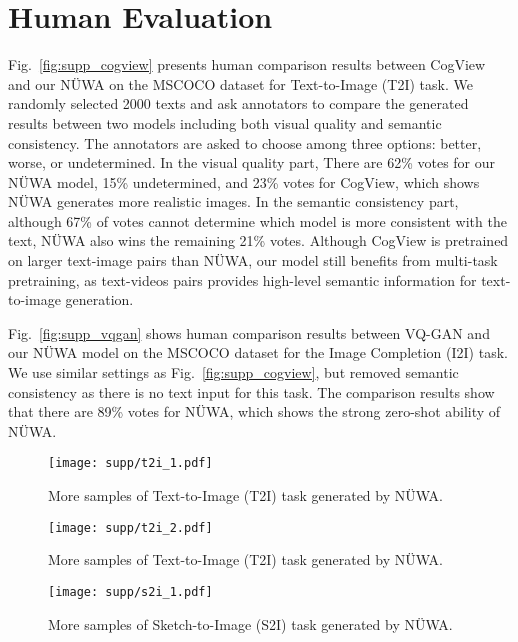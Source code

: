 \documentclass[10pt,twocolumn,letterpaper]{article}
\begin{document}
\section{Human Evaluation}
Fig.~\ref{fig:supp_cogview} presents human comparison results between CogView\cite{dingCogViewMasteringTexttoImage2021} and our NÜWA on the MSCOCO dataset for Text-to-Image (T2I) task. We randomly selected 2000 texts and ask annotators to compare the generated results between two models including both visual quality and semantic consistency. The annotators are asked to choose among three options: better, worse, or undetermined. In the visual quality part, There are 62\% votes for our NÜWA model, 15\% undetermined, and 23\% votes for CogView, which shows NÜWA generates more realistic images. In the semantic consistency part, although 67\% of votes cannot determine which model is more consistent with the text, NÜWA also wins the remaining 21\% votes. Although CogView is pretrained on larger text-image pairs than NÜWA, our model still benefits from multi-task pretraining, as text-videos pairs provides high-level semantic information for text-to-image generation.

Fig.~\ref{fig:supp_vqgan} shows human comparison results between VQ-GAN\cite{esserTamingTransformersHighResolution2021} and our NÜWA model on the MSCOCO dataset for the Image Completion (I2I) task. We use similar settings as Fig.~\ref{fig:supp_cogview}, but removed semantic consistency as there is no text input for this task. The comparison results show that there are 89\% votes for NÜWA, which shows the strong zero-shot ability of NÜWA. 



\begin{figure*}[h]
	\centering
	\texttt{[image: supp/t2i\_1.pdf]}
	\caption{More samples of Text-to-Image (T2I) task generated by NÜWA.}
	\label{fig:supp_t2i_1}
\end{figure*}

\begin{figure*}[h]
	\centering
	\texttt{[image: supp/t2i\_2.pdf]}
	\caption{More samples of Text-to-Image (T2I) task generated by NÜWA.}
	\label{fig:supp_t2i_2}
\end{figure*}

\begin{figure*}[h]
	\centering
	\texttt{[image: supp/s2i\_1.pdf]}
	\caption{More samples of Sketch-to-Image (S2I) task generated by NÜWA.}
	\label{fig:supp_s2i_1}
\end{figure*}
\end{document}
